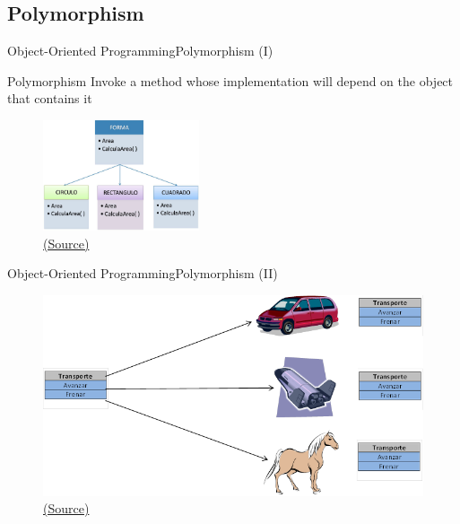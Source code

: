 \documentclass[10pt,compress]{beamer} %
\begin{document}
\subsection{Polymorphism}
\begin{frame}{Object-Oriented Programming}{Polymorphism (I)}
\vspace{-0.2cm}
	\begin{block}{Polymorphism}
		Invoke a method whose implementation will depend on the object that contains it
  	\end{block}	
	\begin{figure}
	  \vspace{-0.2cm}
		\includegraphics[width=4.6cm]{figs/polimorfismo1}\\
		\tiny{\href{http://virtual.uaeh.edu.mx}{(Source)}}
	\end{figure}
\end{frame}

\begin{frame}{Object-Oriented Programming}{Polymorphism (II)}
	\begin{figure}
		\includegraphics[scale=0.5]{figs/polimorfismo2}\\
		\tiny{\href{http://datateca.unad.edu.co}{(Source)}}
	\end{figure}
\end{frame}
\end{document}
